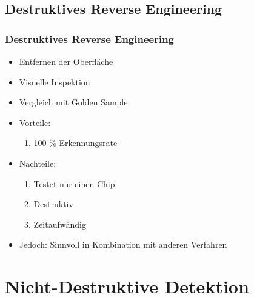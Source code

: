 \documentclass[11pt]{beamer}
\begin{document}
\subsection{Destruktives Reverse Engineering}
\begin{frame}
    \frametitle{Destruktives Reverse Engineering}
    \begin{itemize}
        \item Entfernen der Oberfläche
        \item Visuelle Inspektion
        \item Vergleich mit Golden Sample
        \item Vorteile: 
        \begin{enumerate}
            \item 100 \% Erkennungsrate
        \end{enumerate}
        \item Nachteile:
        \begin{enumerate}
            \item Testet nur einen Chip
            \item Destruktiv
            \item Zeitaufwändig
        \end{enumerate}
        \item Jedoch: Sinnvoll in Kombination mit anderen Verfahren
    \end{itemize}
\end{frame}
\section{Nicht-Destruktive Detektion}
\end{document}
